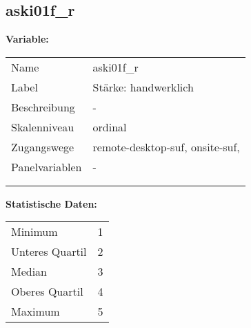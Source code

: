 	
	
	\subsection{aski01f\_r}
	\label{subSection:aski01f_r}

	\noindent\textbf{Variable:}\\
		\begin{tabular}{lL{11.3cm}}
			\label{tableVariable:aski01f_r}
			Name & aski01f\_r \\
			Label & Stärke: handwerklich \\
			Beschreibung & - \\
			Skalenniveau & ordinal \\
			Zugangswege &
				remote-desktop-suf,
				onsite-suf,
 \\
			Panelvariablen & -
			 \\
			 \\
 \\
		\end{tabular}



		\vspace*{1 cm}
		\noindent\textbf{Statistische Daten:}\\
			\begin{tabular}{ll}
				\label{tableStatistics:aski01f_r}
					Minimum & 1 \\
					Unteres Quartil & 2 \\
					Median & 3 \\
					Oberes Quartil & 4 \\
					Maximum & 5 \\
			\end{tabular}



